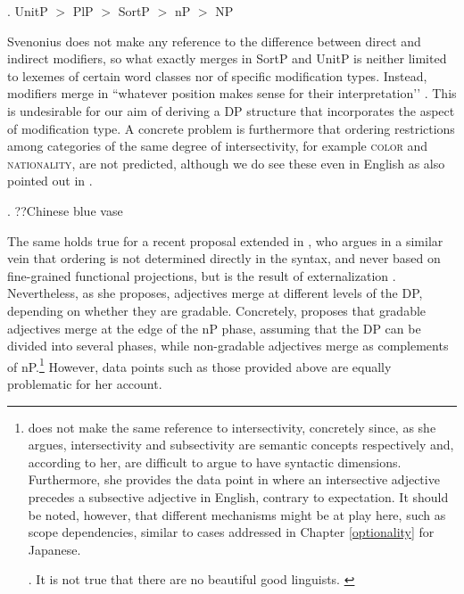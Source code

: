 \documentclass [output=book,colorlinks,citecolor=brown]{langscibook}
\begin{document}
\ex. UnitP $>$ PlP $>$ SortP $>$ nP $>$ NP \null \hfill \citep{svenonius:2008:position}

Svenonius does not make any reference to the difference between direct and indirect modifiers, so what exactly merges in SortP and UnitP is neither limited to lexemes of certain word classes nor of specific modification types. Instead, modifiers merge in ``whatever position makes sense for their interpretation’’ \citep[39]{svenonius:2008:position}. This is undesirable for our aim of deriving a DP structure that incorporates the aspect of modification type. A concrete problem is furthermore that ordering restrictions among categories of the same degree of intersectivity, for example \textsc{color} and \textsc{nationality}, are not predicted, although we do see these even in English as also pointed out in \citet{panayidou:2013:in}.

\ex. ??Chinese blue vase

The same holds true for a recent proposal extended in \citet{manzini:2025:left}, who argues in a similar vein that ordering is not determined directly in the syntax, and never based on fine-grained functional projections, but is the result of externalization \citep{chomsky:2013:problems}. Nevertheless, as she proposes, adjectives merge at different levels of the DP, depending on whether they are gradable. Concretely, \citet[10–16]{manzini:2025:left} proposes that gradable adjectives merge at the edge of the nP phase, assuming that the DP can be divided into several phases, while non-gradable adjectives merge as complements of nP.\footnote{\citet{manzini:2025:left} does not make the same reference to intersectivity, concretely since, as she argues, intersectivity and subsectivity are semantic concepts respectively and, according to her, are difficult to argue to have syntactic dimensions. Furthermore, she provides the data point in \Next where an intersective adjective precedes a subsective adjective in English, contrary to expectation. It should be noted, however, that different mechanisms might be at play here, such as scope dependencies, similar to cases addressed in
Chapter \ref{optionality} for Japanese.

\par

\ex. It is not true that there are no beautiful good linguists. \null \hfill \citep[10]{manzini:2025:left}

\par
}
However, data points such as those provided above are equally problematic for her account.
\end{document}
